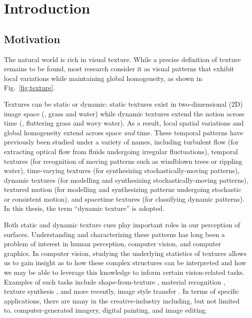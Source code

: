 \chapter{Introduction}

\section{Motivation}

The natural world is rich in visual texture. While a precise definition of 
texture remains to be found, most research consider it as visual patterns that 
exhibit local variations while maintaining global homogeneity, as shown in Fig.\ \ref{fig:texture}.



Textures 
can be static or dynamic: static textures exist in two-dimensional (2D) image space 
(\eg, grass and water) while dynamic textures extend the notion across time (\eg, 
fluttering grass and wavy water). As a result, local spatial variations and 
global homogeneity extend across space \emph{and} time. These temporal patterns 
have previously been studied under a variety of names, including turbulent flow \cite{heeger1986} (for extracting optical flow from fluids undergoing irregular fluctuations), temporal textures \cite{nelson1992} (for recognition of moving patterns such as windblown trees or rippling water), time-varying 
textures \cite{bar-joseph2001} (for synthesizing stochastically-moving patterns), dynamic textures \cite{doretto2003} (for modelling and synthesizing stochastically-moving patterns), textured 
motion \cite{wang2003} (for modelling and synthesizing patterns undergoing stochastic or consistent motion), and spacetime textures \cite{derpanis2012spacetime} (for classifying dynamic patterns).
In this thesis, the term ``dynamic texture'' is adopted.

Both static and dynamic texture cues play important roles in our perception of 
surfaces. Understanding and characterizing these patterns has long been a problem 
of interest in human perception, computer vision, and computer graphics. In 
computer vision, studying the underlying statistics of textures allows us to gain 
insight as to how these complex structures can be interpreted and how we may be 
able to leverage this knowledge to inform certain vision-related tasks. Examples 
of such tasks include shape-from-texture \cite{gibson1950perception}, material recognition \cite{dana1999,adelson2001}, texture 
synthesis \cite{heeger1995pyramid}, and more recently, image style transfer 
\cite{gatys2016image}. In terms of specific applications, 
there are many in the creative-industry including, but not limited to, computer-generated imagery, digital painting, and image editing.

